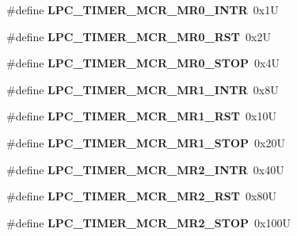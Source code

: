 \begin{DoxyCompactItemize}
\item 
\mbox{\label{group__lpc__timer_ga5999bd14b66b6a8b2b008df319a0193e}} 
\#define {\bfseries L\+P\+C\+\_\+\+T\+I\+M\+E\+R\+\_\+\+M\+C\+R\+\_\+\+M\+R0\+\_\+\+I\+N\+TR}~0x1U
\item 
\mbox{\label{group__lpc__timer_ga73cb34e89417e996ddfe1b3fe73dd262}} 
\#define {\bfseries L\+P\+C\+\_\+\+T\+I\+M\+E\+R\+\_\+\+M\+C\+R\+\_\+\+M\+R0\+\_\+\+R\+ST}~0x2U
\item 
\mbox{\label{group__lpc__timer_ga1c9c5b33bb6e61fe612b8c85925181dd}} 
\#define {\bfseries L\+P\+C\+\_\+\+T\+I\+M\+E\+R\+\_\+\+M\+C\+R\+\_\+\+M\+R0\+\_\+\+S\+T\+OP}~0x4U
\item 
\mbox{\label{group__lpc__timer_gacd4bcbdb0ecdf6ea3dca3418c5164f11}} 
\#define {\bfseries L\+P\+C\+\_\+\+T\+I\+M\+E\+R\+\_\+\+M\+C\+R\+\_\+\+M\+R1\+\_\+\+I\+N\+TR}~0x8U
\item 
\mbox{\label{group__lpc__timer_ga5c6f5313481b4b3c90ab8b4588914ce1}} 
\#define {\bfseries L\+P\+C\+\_\+\+T\+I\+M\+E\+R\+\_\+\+M\+C\+R\+\_\+\+M\+R1\+\_\+\+R\+ST}~0x10U
\item 
\mbox{\label{group__lpc__timer_ga69be0a493a47da6f3b7c6c2019b3526e}} 
\#define {\bfseries L\+P\+C\+\_\+\+T\+I\+M\+E\+R\+\_\+\+M\+C\+R\+\_\+\+M\+R1\+\_\+\+S\+T\+OP}~0x20U
\item 
\mbox{\label{group__lpc__timer_ga3458fe10404b1b0aa11012d99cacff29}} 
\#define {\bfseries L\+P\+C\+\_\+\+T\+I\+M\+E\+R\+\_\+\+M\+C\+R\+\_\+\+M\+R2\+\_\+\+I\+N\+TR}~0x40U
\item 
\mbox{\label{group__lpc__timer_ga2583be3659ca66b3deef0c2d21d687ad}} 
\#define {\bfseries L\+P\+C\+\_\+\+T\+I\+M\+E\+R\+\_\+\+M\+C\+R\+\_\+\+M\+R2\+\_\+\+R\+ST}~0x80U
\item 
\mbox{\label{group__lpc__timer_ga0761ce42c8d1d91f8904f96469cef12c}} 
\#define {\bfseries L\+P\+C\+\_\+\+T\+I\+M\+E\+R\+\_\+\+M\+C\+R\+\_\+\+M\+R2\+\_\+\+S\+T\+OP}~0x100U
\item 

\end{DoxyCompactItemize}
